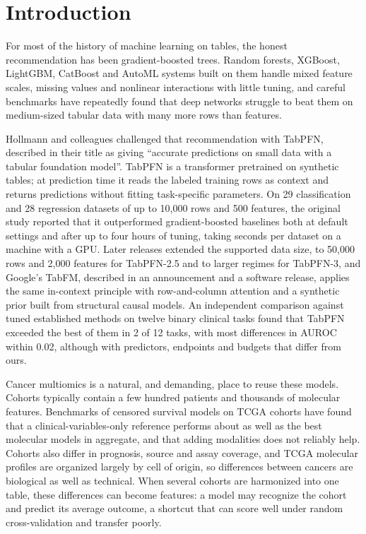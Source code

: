 \section*{Introduction}

For most of the history of machine learning on tables, the honest recommendation has been gradient-boosted trees. Random forests, XGBoost, LightGBM, CatBoost and AutoML systems built on them handle mixed feature scales, missing values and nonlinear interactions with little tuning, and careful benchmarks have repeatedly found that deep networks struggle to beat them on medium-sized tabular data with many more rows than features.\citep{breiman2001random,chen2016xgboost,ke2017lightgbm,prokhorenkova2018catboost,erickson2020autogluon,grinsztajn2022tree}

Hollmann and colleagues challenged that recommendation with TabPFN, described in their title as giving ``accurate predictions on small data with a tabular foundation model''.\citep{hollmann2025accurate} TabPFN is a transformer pretrained on synthetic tables; at prediction time it reads the labeled training rows as context and returns predictions without fitting task-specific parameters. On 29 classification and 28 regression datasets of up to 10,000 rows and 500 features, the original study reported that it outperformed gradient-boosted baselines both at default settings and after up to four hours of tuning, taking seconds per dataset on a machine with a GPU. Later releases extended the supported data size, to 50,000 rows and 2,000 features for TabPFN-2.5 and to larger regimes for TabPFN-3,\citep{priorlabs2025tabpfn25,priorlabs2026tabpfn3} and Google's TabFM, described in an announcement and a software release, applies the same in-context principle with row-and-column attention and a synthetic prior built from structural causal models.\citep{google2026tabfm,tabfmsoftware2026} An independent comparison against tuned established methods on twelve binary clinical tasks found that TabPFN exceeded the best of them in 2 of 12 tasks, with most differences in AUROC within 0.02, although with predictors, endpoints and budgets that differ from ours.\citep{shaktah2026established}

Cancer multiomics is a natural, and demanding, place to reuse these models. Cohorts typically contain a few hundred patients and thousands of molecular features. Benchmarks of censored survival models on TCGA cohorts have found that a clinical-variables-only reference performs about as well as the best molecular models in aggregate, and that adding modalities does not reliably help.\citep{herrmann2021benchmark,li2024combining,wissel2023systematic} Cohorts also differ in prognosis, source and assay coverage, and TCGA molecular profiles are organized largely by cell of origin,\citep{hoadley2018cell} so differences between cancers are biological as well as technical. When several cohorts are harmonized into one table, these differences can become features: a model may recognize the cohort and predict its average outcome, a shortcut that can score well under random cross-validation and transfer poorly.\citep{soneson2014batch,bernau2014crossstudy,geirhos2020shortcut}

